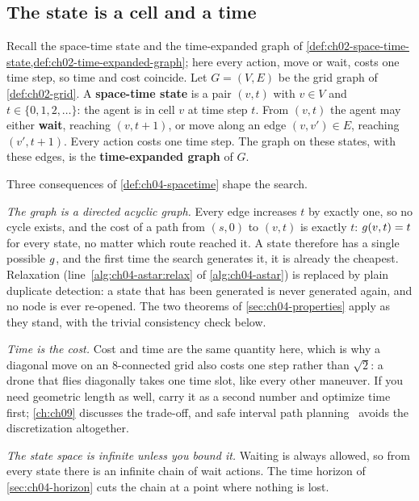 \subsection{The state is a cell and a time}

\begin{definition}
\label{def:ch04-spacetime}
Recall the space-time state and the time-expanded graph of
\cref{def:ch02-space-time-state,def:ch02-time-expanded-graph}; here every
action, move or wait, costs one time step, so time and cost coincide. Let
$G = (V, E)$ be the grid graph of \cref{def:ch02-grid}. A \textbf{space-time
state} is a pair $(v, t)$ with $v \in V$ and
$t \in \{0, 1, 2, \dots\}$: the agent is in cell $v$ at time step $t$. From
$(v, t)$ the agent may
either \textbf{wait}, reaching $(v, t+1)$, or move along an
edge $(v, v') \in E$, reaching $(v', t+1)$. Every action costs one time step. The graph on these states, with these edges,
is the \textbf{time-expanded graph} of $G$.
\end{definition}

Three consequences of \cref{def:ch04-spacetime} shape the search.

\emph{The graph is a directed acyclic graph.} Every edge increases $t$ by
exactly one, so no cycle exists, and the cost of a path from $(s, 0)$ to
$(v, t)$ is exactly $t$: $g(v, t) = t$ for every state, no matter which
route reached it. A state therefore has a single possible $g$, and the
first time the search generates it, it is already the cheapest. Relaxation
(line~\ref{alg:ch04-astar:relax} of \cref{alg:ch04-astar}) is replaced by plain
duplicate detection: a state that has been generated is never generated again,
and no node is ever re-opened. The two theorems of
\cref{sec:ch04-properties} apply as they stand, with the trivial consistency
check below.

\emph{Time is the cost.} Cost and time are the same quantity here, which is why
a diagonal move on an 8-connected grid also costs one step rather than
$\sqrt{2}$: a drone that flies diagonally takes one time slot, like every other
maneuver. If you need geometric length as well, carry it as a second number and
optimize time first; \cref{ch:ch09} discusses the trade-off, and safe interval
path planning~\cite{phillips2011sipp} avoids the discretization altogether.

\emph{The state space is infinite unless you bound it.} Waiting is always
allowed, so from every state there is an infinite chain of wait actions. The
time horizon of \cref{sec:ch04-horizon} cuts the chain at a point where nothing
is lost.

